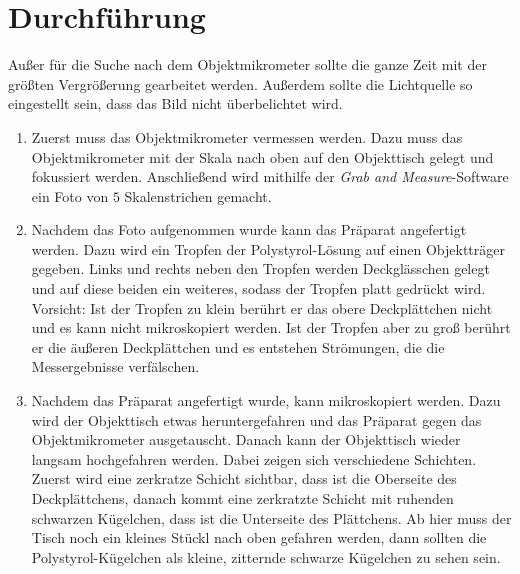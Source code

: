 \section*{Durchführung}

Außer für die Suche nach dem Objektmikrometer sollte die ganze Zeit mit der größten Vergrößerung gearbeitet werden. Außerdem sollte die Lichtquelle so eingestellt sein, dass das Bild nicht überbelichtet wird.
\begin{enumerate}

  \item Zuerst muss das Objektmikrometer vermessen werden. Dazu muss das Objektmikrometer mit der Skala nach oben auf den Objekttisch gelegt und fokussiert werden. Anschließend wird mithilfe der \emph{Grab and Measure}-Software ein Foto von $5$ Skalenstrichen gemacht.

  \item Nachdem das Foto aufgenommen wurde kann das Präparat angefertigt werden. Dazu wird ein Tropfen der Polystyrol-Lösung auf einen Objektträger gegeben. Links und rechts neben den Tropfen werden Deckglässchen gelegt und auf diese beiden ein weiteres, sodass der Tropfen platt gedrückt wird. Vorsicht: Ist der Tropfen zu klein berührt er das obere Deckplättchen nicht und es kann nicht mikroskopiert werden. Ist der Tropfen aber zu groß berührt er die äußeren Deckplättchen und es entstehen Strömungen, die die Messergebnisse verfälschen.

  \item Nachdem das Präparat angefertigt wurde, kann mikroskopiert werden. Dazu wird der Objekttisch etwas heruntergefahren und das Präparat gegen das Objektmikrometer ausgetauscht. Danach kann der Objekttisch wieder langsam hochgefahren werden. Dabei zeigen sich verschiedene Schichten. Zuerst wird eine zerkratze Schicht sichtbar, dass ist die Oberseite des Deckplättchens, danach kommt eine zerkratzte Schicht mit ruhenden schwarzen Kügelchen, dass ist die Unterseite des Plättchens. Ab hier muss der Tisch noch ein kleines Stückl nach oben gefahren werden, dann sollten die Polystyrol-Kügelchen als kleine, zitternde schwarze Kügelchen zu sehen sein.


\end{enumerate}
